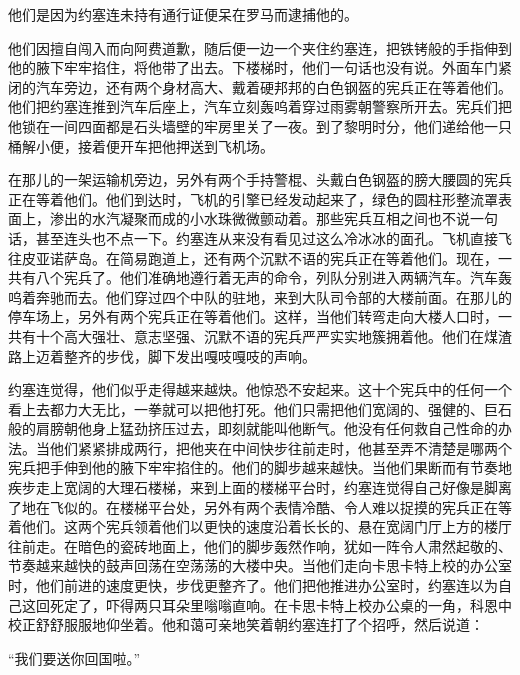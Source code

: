     他们是因为约塞连未持有通行证便呆在罗马而逮捕他的。

    他们因擅自闯入而向阿费道歉，随后便一边一个夹住约塞连，把铁铐般的手指伸到他的腋下牢牢掐住，将他带了出去。下楼梯时，他们一句话也没有说。外面车门紧闭的汽车旁边，还有两个身材高大、戴着硬邦邦的白色钢盔的宪兵正在等着他们。他们把约塞连推到汽车后座上，汽车立刻轰呜着穿过雨雾朝警察所开去。宪兵们把他锁在一间四面都是石头墙壁的牢房里关了一夜。到了黎明时分，他们递给他一只桶解小便，接着便开车把他押送到飞机场。

    在那儿的一架运输机旁边，另外有两个手持警棍、头戴白色钢盔的膀大腰圆的宪兵正在等着他们。他们到达时，飞机的引擎已经发动起来了，绿色的圆柱形整流罩表面上，渗出的水汽凝聚而成的小水珠微微颤动着。那些宪兵互相之间也不说一句话，甚至连头也不点一下。约塞连从来没有看见过这么冷冰冰的面孔。飞机直接飞往皮亚诺萨岛。在简易跑道上，还有两个沉默不语的宪兵正在等着他们。现在，一共有八个宪兵了。他们准确地遵行着无声的命令，列队分别进入两辆汽车。汽车轰呜着奔驰而去。他们穿过四个中队的驻地，来到大队司令部的大楼前面。在那儿的停车场上，另外有两个宪兵正在等着他们。这样，当他们转弯走向大楼人口时，一共有十个高大强壮、意志坚强、沉默不语的宪兵严严实实地簇拥着他。他们在煤渣路上迈着整齐的步伐，脚下发出嘎吱嘎吱的声响。

    约塞连觉得，他们似乎走得越来越炔。他惊恐不安起来。这十个宪兵中的任何一个看上去都力大无比，一拳就可以把他打死。他们只需把他们宽阔的、强健的、巨石般的肩膀朝他身上猛劲挤压过去，即刻就能叫他断气。他没有任何救自己性命的办法。当他们紧紧排成两行，把他夹在中间快步往前走时，他甚至弄不清楚是哪两个宪兵把手伸到他的腋下牢牢掐住的。他们的脚步越来越快。当他们果断而有节奏地疾步走上宽阔的大理石楼梯，来到上面的楼梯平台时，约塞连觉得自己好像是脚离了地在飞似的。在楼梯平台处，另外有两个表情冷酷、令人难以捉摸的宪兵正在等着他们。这两个宪兵领着他们以更快的速度沿着长长的、悬在宽阔门厅上方的楼厅往前走。在暗色的瓷砖地面上，他们的脚步轰然作响，犹如一阵令人肃然起敬的、节奏越来越快的鼓声回荡在空荡荡的大楼中央。当他们走向卡思卡特上校的办公室时，他们前进的速度更快，步伐更整齐了。他们把他推进办公室时，约塞连以为自己这回死定了，吓得两只耳朵里嗡嗡直响。在卡思卡特上校办公桌的一角，科恩中校正舒舒服服地仰坐着。他和蔼可亲地笑着朝约塞连打了个招呼，然后说道：

    “我们要送你回国啦。”
